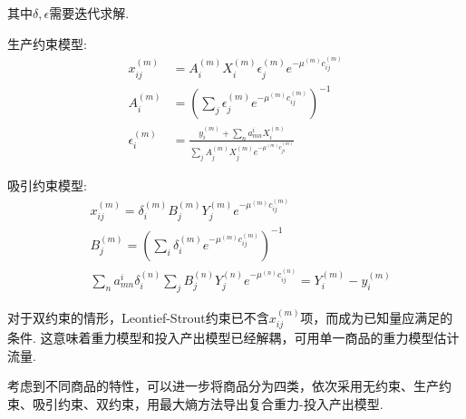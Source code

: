 其中$\delta,\epsilon$需要迭代求解. 
\par 生产约束模型:
\begin{align}
x_{ij}^{(m)}&=A_i^{(m)}X_i^{(m)} \epsilon_j^{(m)} e^{-\mu^{(m)} c_{ij}^{(m)}}\\
A_i^{(m)}&=\left(\sum_j \epsilon_j^{(m)} e^{-\mu^{(m)} c_{ij}^{(m)}}\right)^{-1}\\
\epsilon_i^{(m)}&=\frac{y_i^{(m)}+\sum_n a_{mn}^i X_i^{(n)}}{\sum_j A_j^{(m)}X_j^{(m)} e^{-\mu^{(m)}c_{ji}^{(m)}}}
\end{align}
\par 吸引约束模型:
\begin{align}
&x_{ij}^{(m)}=\delta_i^{(m)}B_j^{(m)}Y_j^{(m)}  e^{-\mu^{(m)} c_{ij}^{(m)}}\\
&B_j^{(m)}=\left(\sum_i \delta_i^{(m)} e^{-\mu^{(m)} c_{ij}^{(m)}}\right)^{-1}\\
&\sum_n a_{mn}^i \delta_i^{(n)}\sum_j B_j^{(n)}Y_j^{(n)}e^{-\mu^{(n)} c_{ij}^{(n)}}=Y_i^{(m)}-y_i^{(m)}
\end{align} 
\par 对于双约束的情形，Leontief-Strout约束已不含$x_{ij}^{(m)}$项，而成为已知量应满足的条件. 这意味着重力模型和投入产出模型已经解耦，可用单一商品的重力模型估计流量. 
\par 考虑到不同商品的特性，可以进一步将商品分为四类，依次采用无约束、生产约束、吸引约束、双约束，用最大熵方法导出复合重力-投入产出模型.